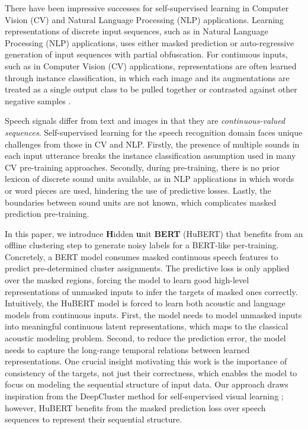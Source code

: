 There have been impressive successes for self-supervised learning in Computer Vision (CV) \cite{caron2020Swav, Chen2020SimSiam, grill2020byol} and Natural Language Processing (NLP) \cite{brown2020gpt3, liu2019roberta, lewis2019bart} applications. Learning representations of discrete input sequences, such as in Natural Language Processing (NLP) applications, uses either masked prediction \cite{devlin2018bert, clark2020electra} or auto-regressive generation \cite{peters2018deep, lewis2019bart} of input sequences with partial obfuscation. For continuous inputs, such as in Computer Vision (CV) applications, representations are often learned through instance classification, in which each image and its augmentations are treated as a single output class to be pulled together \cite{Chen2020SimSiam, grill2020byol} or contrasted against other negative samples \cite{he2020momentum}.

Speech signals differ from text and images in that they are \textit{continuous-valued} \textit{sequences}. Self-supervised learning for the speech recognition domain faces unique challenges from those in CV and NLP. Firstly, the presence of multiple sounds in each input utterance breaks the instance classification assumption used in many CV pre-training approaches. Secondly, during pre-training, there is no prior lexicon of discrete sound units available, as in NLP applications in which words or word pieces are used, hindering the use of predictive losses. Lastly, the boundaries between sound units are not known, which complicates masked prediction pre-training.

In this paper, we introduce \textbf{H}idden \textbf{u}nit \textbf{BERT} (HuBERT) that benefits from an offline clustering step to generate noisy labels for a BERT-like per-training. Concretely, a BERT model consumes masked continuous speech features to predict pre-determined cluster assignments. The predictive loss is only applied over the masked regions, forcing the model to learn good high-level representations of unmasked inputs to infer the targets of masked ones correctly. Intuitively, the HuBERT model is forced to learn both acoustic and language models from continuous inputs. First, the model needs to model unmasked inputs into meaningful continuous latent representations, which maps to the classical acoustic modeling problem. Second, to reduce the prediction error, the model needs to capture the long-range temporal relations between learned representations. One crucial insight motivating this work is the importance of consistency of the targets, not just their correctness, which enables the model to focus on modeling the sequential structure of input data. Our approach draws inspiration from the DeepCluster method for self-supervised visual learning \cite{caron2018deep}; however, HuBERT benefits from the masked prediction loss over speech sequences to represent their sequential structure.

